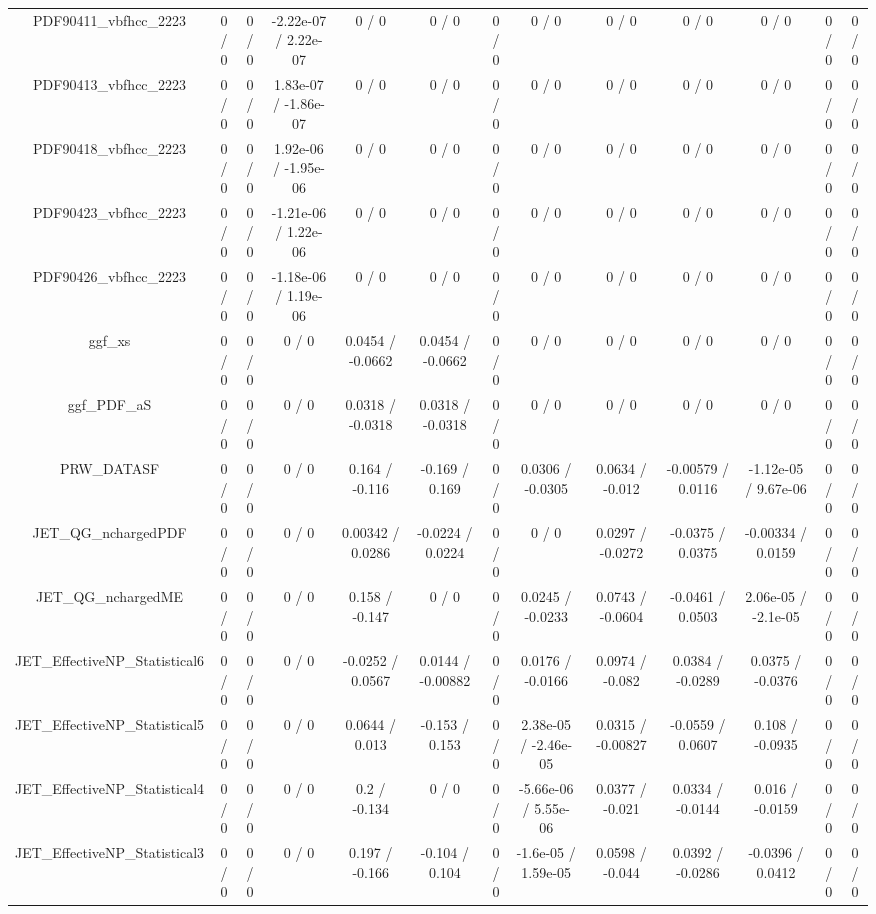 \documentclass[10pt]{article}
\begin{document}
\begin{table}[htbp]
\begin{center}
\begin{tabular}{|c|c|c|c|c|c|c|c|c|c|c|c|c|}
  PDF90411_vbfhcc_2223 & 0 / 0 & 0 / 0 & -2.22e-07 / 2.22e-07 & 0 / 0 & 0 / 0 & 0 / 0 & 0 / 0 & 0 / 0 & 0 / 0 & 0 / 0 & 0 / 0 & 0 / 0 \\ 
  PDF90413_vbfhcc_2223 & 0 / 0 & 0 / 0 & 1.83e-07 / -1.86e-07 & 0 / 0 & 0 / 0 & 0 / 0 & 0 / 0 & 0 / 0 & 0 / 0 & 0 / 0 & 0 / 0 & 0 / 0 \\ 
  PDF90418_vbfhcc_2223 & 0 / 0 & 0 / 0 & 1.92e-06 / -1.95e-06 & 0 / 0 & 0 / 0 & 0 / 0 & 0 / 0 & 0 / 0 & 0 / 0 & 0 / 0 & 0 / 0 & 0 / 0 \\ 
  PDF90423_vbfhcc_2223 & 0 / 0 & 0 / 0 & -1.21e-06 / 1.22e-06 & 0 / 0 & 0 / 0 & 0 / 0 & 0 / 0 & 0 / 0 & 0 / 0 & 0 / 0 & 0 / 0 & 0 / 0 \\ 
  PDF90426_vbfhcc_2223 & 0 / 0 & 0 / 0 & -1.18e-06 / 1.19e-06 & 0 / 0 & 0 / 0 & 0 / 0 & 0 / 0 & 0 / 0 & 0 / 0 & 0 / 0 & 0 / 0 & 0 / 0 \\ 
  ggf_xs & 0 / 0 & 0 / 0 & 0 / 0 & 0.0454 / -0.0662 & 0.0454 / -0.0662 & 0 / 0 & 0 / 0 & 0 / 0 & 0 / 0 & 0 / 0 & 0 / 0 & 0 / 0 \\ 
  ggf_PDF_aS & 0 / 0 & 0 / 0 & 0 / 0 & 0.0318 / -0.0318 & 0.0318 / -0.0318 & 0 / 0 & 0 / 0 & 0 / 0 & 0 / 0 & 0 / 0 & 0 / 0 & 0 / 0 \\ 
  PRW_DATASF & 0 / 0 & 0 / 0 & 0 / 0 & 0.164 / -0.116 & -0.169 / 0.169 & 0 / 0 & 0.0306 / -0.0305 & 0.0634 / -0.012 & -0.00579 / 0.0116 & -1.12e-05 / 9.67e-06 & 0 / 0 & 0 / 0 \\ 
  JET_QG_nchargedPDF & 0 / 0 & 0 / 0 & 0 / 0 & 0.00342 / 0.0286 & -0.0224 / 0.0224 & 0 / 0 & 0 / 0 & 0.0297 / -0.0272 & -0.0375 / 0.0375 & -0.00334 / 0.0159 & 0 / 0 & 0 / 0 \\ 
  JET_QG_nchargedME & 0 / 0 & 0 / 0 & 0 / 0 & 0.158 / -0.147 & 0 / 0 & 0 / 0 & 0.0245 / -0.0233 & 0.0743 / -0.0604 & -0.0461 / 0.0503 & 2.06e-05 / -2.1e-05 & 0 / 0 & 0 / 0 \\ 
  JET_EffectiveNP_Statistical6 & 0 / 0 & 0 / 0 & 0 / 0 & -0.0252 / 0.0567 & 0.0144 / -0.00882 & 0 / 0 & 0.0176 / -0.0166 & 0.0974 / -0.082 & 0.0384 / -0.0289 & 0.0375 / -0.0376 & 0 / 0 & 0 / 0 \\ 
  JET_EffectiveNP_Statistical5 & 0 / 0 & 0 / 0 & 0 / 0 & 0.0644 / 0.013 & -0.153 / 0.153 & 0 / 0 & 2.38e-05 / -2.46e-05 & 0.0315 / -0.00827 & -0.0559 / 0.0607 & 0.108 / -0.0935 & 0 / 0 & 0 / 0 \\ 
  JET_EffectiveNP_Statistical4 & 0 / 0 & 0 / 0 & 0 / 0 & 0.2 / -0.134 & 0 / 0 & 0 / 0 & -5.66e-06 / 5.55e-06 & 0.0377 / -0.021 & 0.0334 / -0.0144 & 0.016 / -0.0159 & 0 / 0 & 0 / 0 \\ 
  JET_EffectiveNP_Statistical3 & 0 / 0 & 0 / 0 & 0 / 0 & 0.197 / -0.166 & -0.104 / 0.104 & 0 / 0 & -1.6e-05 / 1.59e-05 & 0.0598 / -0.044 & 0.0392 / -0.0286 & -0.0396 / 0.0412 & 0 / 0 & 0 / 0 \\ 

\end{tabular}
\end{center}
\end{table}
\end{document}
